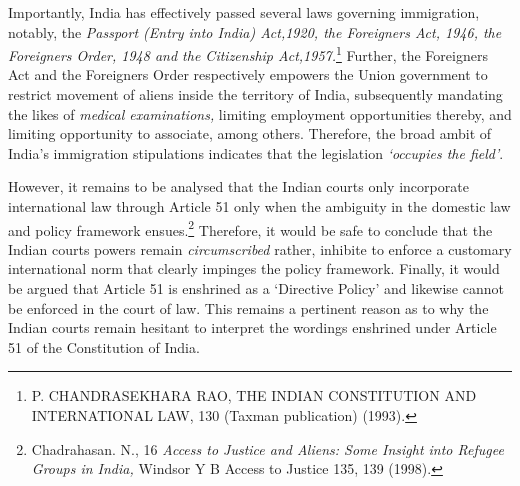 \begin{multicols}{2}
\noi
Importantly, India has effectively passed several laws governing immigration, notably, the
\textit{Passport (Entry into India) Act,1920, the Foreigners Act, 1946, the Foreigners Order, 1948
and the Citizenship Act,1957.}\footnote{P. CHANDRASEKHARA RAO, THE INDIAN CONSTITUTION AND INTERNATIONAL LAW, 130 (Taxman publication) (1993).} Further, the Foreigners Act and the Foreigners Order
respectively empowers the Union government to restrict movement of aliens inside the
territory of India, subsequently mandating the likes of \textit{medical examinations,} limiting
employment opportunities thereby, and limiting opportunity to associate, among others.
Therefore, the broad ambit of India's immigration stipulations indicates that the legislation
\textit{‘occupies the field’}.


\noi
However, it remains to be analysed that the Indian courts only incorporate international law
through Article 51 only when the ambiguity in the domestic law and policy framework
ensues.\footnote{Chadrahasan. N., 16 \textit{Access to Justice and Aliens: Some Insight into Refugee Groups in India,} Windsor Y B Access to Justice 135, 139 (1998).} Therefore, it would be safe to conclude that the Indian courts powers remain \textit{circumscribed} rather, inhibite to enforce a customary international norm that clearly
impinges the policy framework. Finally, it would be argued that Article 51 is enshrined as a
‘Directive Policy’ and likewise cannot be enforced in the court of law. This remains a
pertinent reason as to why the Indian courts remain hesitant to interpret the wordings
enshrined under Article 51 of the Constitution of India.





\end{multicols}
